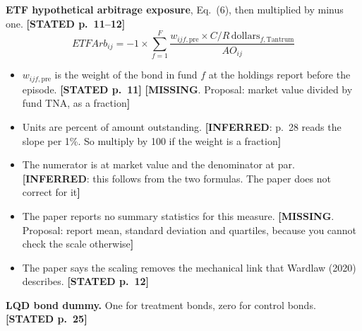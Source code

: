 \documentclass[10pt,a4paper]{article}
\newcommand{\ST}[1]{\textcolor{cst}{\textbf{[STATED #1]}}}
\newcommand{\IN}[1]{\textcolor{cin}{\textbf{[INFERRED}: #1\textbf{]}}}
\newcommand{\MI}[1]{\textcolor{cmi}{\textbf{[MISSING}. Proposal: #1\textbf{]}}}
\begin{document}
\textbf{ETF hypothetical arbitrage exposure}, Eq.~(6), then multiplied by minus one. \ST{p.~11--12}
\begin{equation}\label{eq:arb}
\mathit{ETFArb}_{ij}=-1\times\sum_{f=1}^{F}\frac{w_{ijf,\text{pre}}\times C/R\,\text{dollars}_{f,\text{Tantrum}}}{AO_{ij}}
\end{equation}
\begin{itemize}
\item $w_{ijf,\text{pre}}$ is the weight of the bond in fund $f$ at the holdings report before the episode. \ST{p.~11} \MI{market value divided by fund TNA, as a fraction}
\item Units are percent of amount outstanding. \IN{p.~28 reads the slope per 1\%. So multiply by 100 if the weight is a fraction}
\item The numerator is at market value and the denominator at par. \IN{this follows from the two formulas. The paper does not correct for it}
\item The paper reports no summary statistics for this measure. \MI{report mean, standard deviation and quartiles, because you cannot check the scale otherwise}
\item The paper says the scaling removes the mechanical link that Wardlaw (2020) describes. \ST{p.~12}
\end{itemize}

\textbf{LQD bond dummy.} One for treatment bonds, zero for control bonds. \ST{p.~25}
\end{document}
